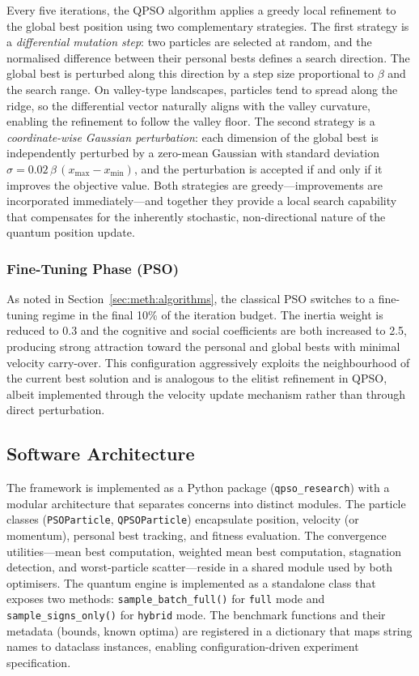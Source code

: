 Every five iterations, the QPSO algorithm applies a greedy local refinement to
the global best position using two complementary strategies.  The first
strategy is a \emph{differential mutation step}: two particles are selected at
random, and the normalised difference between their personal bests defines a
search direction.  The global best is perturbed along this direction by a step
size proportional to $\beta$ and the search range.  On valley-type landscapes,
particles tend to spread along the ridge, so the differential vector naturally
aligns with the valley curvature, enabling the refinement to follow the
valley floor.  The second strategy is a \emph{coordinate-wise Gaussian
perturbation}: each dimension of the global best is independently perturbed by
a zero-mean Gaussian with standard deviation $\sigma = 0.02\,\beta\,(x_{\max}
- x_{\min})$, and the perturbation is accepted if and only if it improves the
objective value.  Both strategies are greedy---improvements are incorporated
immediately---and together they provide a local search capability that
compensates for the inherently stochastic, non-directional nature of the
quantum position update.

\subsubsection{Fine-Tuning Phase (PSO)}

As noted in Section~\ref{sec:meth:algorithms}, the classical PSO switches to a
fine-tuning regime in the final 10\% of the iteration budget.  The inertia
weight is reduced to 0.3 and the cognitive and social coefficients are both
increased to 2.5, producing strong attraction toward the personal and global
bests with minimal velocity carry-over.  This configuration aggressively
exploits the neighbourhood of the current best solution and is analogous to the
elitist refinement in QPSO, albeit implemented through the velocity update
mechanism rather than through direct perturbation.


\subsection{Software Architecture}
\label{sec:meth:software}

The framework is implemented as a Python package (\texttt{qpso\_research})
with a modular architecture that separates concerns into distinct modules.
The particle classes (\texttt{PSOParticle}, \texttt{QPSOParticle}) encapsulate
position, velocity (or momentum), personal best tracking, and fitness
evaluation.  The convergence utilities---mean best computation, weighted mean
best computation, stagnation detection, and worst-particle scatter---reside in
a shared module used by both optimisers.  The quantum engine is implemented as
a standalone class that exposes two methods: \texttt{sample\_batch\_full()} for
\texttt{full} mode and \texttt{sample\_signs\_only()} for \texttt{hybrid}
mode.  The benchmark functions and their metadata (bounds, known optima) are
registered in a dictionary that maps string names to dataclass instances,
enabling configuration-driven experiment specification.

